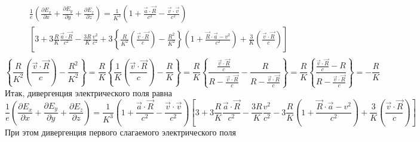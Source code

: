 \documentclass[11pt]{article}
\begin{document}
\[\begin{align}
  & \frac{1}{e}\left( \frac{\partial {{E}_{x}}}{\partial x}+\frac{\partial {{E}_{y}}}{\partial y}+\frac{\partial {{E}_{z}}}{\partial z} \right)=\frac{1}{{{K}^{3}}}\left( 1+\frac{\overrightarrow{a}\cdot \overrightarrow{R}}{{{c}^{2}}}-\frac{\overrightarrow{v}\cdot \overrightarrow{v}}{{{c}^{2}}} \right) \\ 
 & \left[ 3+3\frac{R}{K}\frac{\overrightarrow{a}\cdot \overrightarrow{R}}{{{c}^{2}}}-\frac{3R}{K}\frac{{{v}^{2}}}{{{c}^{2}}}+3\left\{ \frac{R}{{{K}^{2}}}\left( \frac{\overrightarrow{v}\cdot \overrightarrow{R}}{c} \right)-\frac{{{R}^{2}}}{{{K}^{2}}} \right\}\left( 1+\frac{\overrightarrow{R}\cdot \overrightarrow{a}-{{v}^{2}}}{{{c}^{2}}} \right)+\frac{3}{K}\left( \frac{\overrightarrow{v}\cdot \overrightarrow{R}}{c} \right) \right] \\ 
\end{align}\]
\[\left\{ \frac{R}{{{K}^{2}}}\left( \frac{\overrightarrow{v}\cdot \overrightarrow{R}}{c} \right)-\frac{{{R}^{2}}}{{{K}^{2}}} \right\}=\frac{R}{K}\left\{ \frac{1}{K}\left( \frac{\overrightarrow{v}\cdot \overrightarrow{R}}{c} \right)-\frac{R}{K} \right\}=\frac{R}{K}\left\{ \frac{\frac{\overrightarrow{v}\cdot \overrightarrow{R}}{c}}{R-\frac{\overrightarrow{v}\cdot \overrightarrow{R}}{c}}-\frac{R}{R-\frac{\overrightarrow{v}\cdot \overrightarrow{R}}{c}} \right\}=\frac{R}{K}\left\{ \frac{\frac{\overrightarrow{v}\cdot \overrightarrow{R}}{c}-R}{R-\frac{\overrightarrow{v}\cdot \overrightarrow{R}}{c}} \right\}=-\frac{R}{K}\]
Итак, дивергенция электрического поля равна
\[\frac{1}{e}\left( \frac{\partial {{E}_{x}}}{\partial x}+\frac{\partial {{E}_{y}}}{\partial y}+\frac{\partial {{E}_{z}}}{\partial z} \right)=\frac{1}{{{K}^{3}}}\left( 1+\frac{\overrightarrow{a}\cdot \overrightarrow{R}}{{{c}^{2}}}-\frac{\overrightarrow{v}\cdot \overrightarrow{v}}{{{c}^{2}}} \right)\left[ 3+3\frac{R}{K}\frac{\overrightarrow{a}\cdot \overrightarrow{R}}{{{c}^{2}}}-\frac{3R}{K}\frac{{{v}^{2}}}{{{c}^{2}}}-3\frac{R}{K}\left( 1+\frac{\overrightarrow{R}\cdot \overrightarrow{a}-{{v}^{2}}}{{{c}^{2}}} \right)+\frac{3}{K}\left( \frac{\overrightarrow{v}\cdot \overrightarrow{R}}{c} \right) \right]\]
При этом дивергенция первого слагаемого электрического поля
\end{document}
